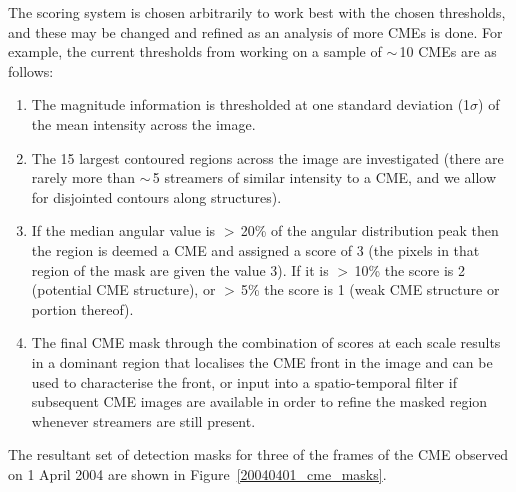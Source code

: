 \documentclass[namedreferences]{SolarPhysics}
\begin{document}
\begin{article}
The scoring system is chosen arbitrarily to work best with the chosen thresholds, and these may be changed and refined as an analysis of more CMEs is done. For example, the current thresholds from working on a sample of $\sim$\,10 CMEs are as follows:
\begin{enumerate}
\item The magnitude information is thresholded at one standard deviation (1$\sigma$) of the mean intensity across the image.
\item The 15 largest contoured regions across the image are investigated (there are rarely more than $\sim$\,5 streamers of similar intensity to a CME, and we allow for disjointed contours along structures). 
\item If the median angular value is $>$\,20\% of the angular distribution peak then the region is deemed a CME and assigned a score of 3 (the pixels in that region of the mask are given the value 3). 
If it is $>$\,10\% the score is 2 (potential CME structure), or $>$\,5\% the score is 1 (weak CME structure or portion thereof).
\item The final CME mask through the combination of scores at each scale results in a dominant region that localises the CME front in the image and can be used to characterise the front, or input into a spatio-temporal filter if subsequent CME images are available in order to refine the masked region whenever streamers are still present. 
\end{enumerate}
The resultant set of detection masks for three of the frames of the CME observed on 1 April 2004 are shown in Figure~\ref{20040401_cme_masks}.


\end{article}
\end{document}
